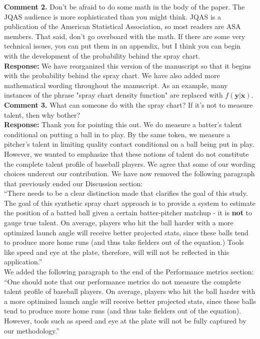 \documentclass[12pt]{article}
\newcommand{\y}{\textbf{y}}
\newcommand{\x}{\textbf{x}}
\begin{document}
\noindent\textbf{Comment 2.} Don’t be afraid to do some math in the body of the paper. The JQAS audience is more sophisticated than you might think. JQAS is a publication of the American Statistical Association, so most readers are ASA members. That said, don’t go overboard with the math. If there are some very technical issues, you can put them in an appendix, but I think you can begin with the development of the probability behind the spray chart. \\


\noindent\textbf{Response:} We have reorganized this version of the manuscript so that it begins with the probability behind the spray chart. We have also added more mathematical wording throughout the manuscript. As an example, many instances of the phrase "spray chart density function" are replaced with $f(\y|\x)$.  \\

\noindent\textbf{Comment 3.} What can someone do with the spray chart? If it’s not to measure talent, then why bother? \\

\noindent\textbf{Response:} Thank you for pointing this out. We do measure a batter's talent conditional on putting a ball in to play. By the same token, we measure a pitcher's talent in limiting quality contact conditional on a ball being put in play. However, we wanted to emphasize that these notions of talent do not constitute the complete talent profile of baseball players. We agree that some of our wording choices undercut our contribution. We have now removed the following paragraph that previously ended our Discussion section: \\

``There needs to be a clear distinction made that clarifies the goal of this study. The goal of this synthetic spray chart approach is to provide a system to estimate the position of a batted ball given a certain batter-pitcher matchup - it is \textbf{not} to gauge true talent. On average, players who hit the ball harder with a more optimized launch angle will receive better projected stats, since these balls tend to produce more home runs (and thus take fielders out of the equation.) Tools like speed and eye at the plate, therefore, will will not be reflected in this application.'' \\

\noindent We added the following paragraph to the end of the Performance metrics section: \\

``One should note that our performance metrics do not measure the complete talent profile of baseball players. On average, players who hit the ball harder with a more optimized launch angle will receive better projected stats, since these balls tend to produce more home runs (and thus take fielders out of the equation). However, tools such as speed and eye at the plate will not be fully captured by our methodology.''
	
\end{document}
